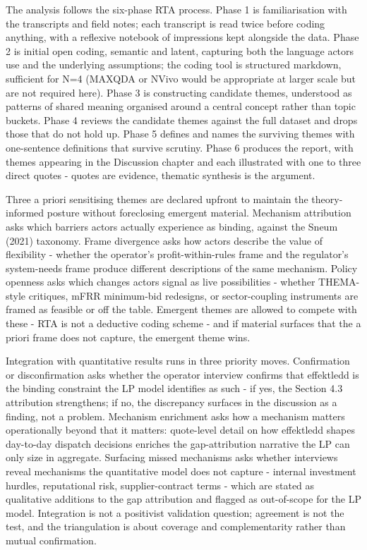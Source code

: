 The analysis follows the six-phase RTA process. Phase 1 is familiarisation with the transcripts and field notes; each transcript is read twice before coding anything, with a reflexive notebook of impressions kept alongside the data. Phase 2 is initial open coding, semantic and latent, capturing both the language actors use and the underlying assumptions; the coding tool is structured markdown, sufficient for N=4 (MAXQDA or NVivo would be appropriate at larger scale but are not required here). Phase 3 is constructing candidate themes, understood as patterns of shared meaning organised around a central concept rather than topic buckets. Phase 4 reviews the candidate themes against the full dataset and drops those that do not hold up. Phase 5 defines and names the surviving themes with one-sentence definitions that survive scrutiny. Phase 6 produces the report, with themes appearing in the Discussion chapter and each illustrated with one to three direct quotes - quotes are evidence, thematic synthesis is the argument.

Three a priori sensitising themes are declared upfront to maintain the theory-informed posture without foreclosing emergent material. Mechanism attribution asks which barriers actors actually experience as binding, against the Sneum (2021) taxonomy. Frame divergence asks how actors describe the value of flexibility - whether the operator's profit-within-rules frame and the regulator's system-needs frame produce different descriptions of the same mechanism. Policy openness asks which changes actors signal as live possibilities - whether THEMA-style critiques, mFRR minimum-bid redesigns, or sector-coupling instruments are framed as feasible or off the table. Emergent themes are allowed to compete with these - RTA is not a deductive coding scheme - and if material surfaces that the a priori frame does not capture, the emergent theme wins.

Integration with quantitative results runs in three priority moves. Confirmation or disconfirmation asks whether the operator interview confirms that effektledd is the binding constraint the LP model identifies as such - if yes, the Section 4.3 attribution strengthens; if no, the discrepancy surfaces in the discussion as a finding, not a problem. Mechanism enrichment asks how a mechanism matters operationally beyond that it matters: quote-level detail on how effektledd shapes day-to-day dispatch decisions enriches the gap-attribution narrative the LP can only size in aggregate. Surfacing missed mechanisms asks whether interviews reveal mechanisms the quantitative model does not capture - internal investment hurdles, reputational risk, supplier-contract terms - which are stated as qualitative additions to the gap attribution and flagged as out-of-scope for the LP model. Integration is not a positivist validation question; agreement is not the test, and the triangulation is about coverage and complementarity rather than mutual confirmation.

